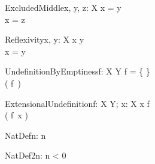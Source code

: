 
\begin{theorem}{ExcludedMiddle}{x, \const y, \const z: X}
x = y \\
x = z
\end{theorem}

\begin{theorem}{Reflexivity}{x, y: X}
x \neq y \\
x = y
\end{theorem}


\begin{theorem}{UndefinitionByEmptiness}{f: X \pfun Y}
f = \{ \} \\
\sw( f~\anything ) \\
\end{theorem}

\begin{theorem}{ExtensionalUndefinition}{f: X \pfun Y; x: X}
x \notin \dom f \\
\sw( f~x ) \\
\end{theorem}


\begin{theorem}{NatDef}{n: \nat}
 \leq n
\end{theorem}

\begin{theorem}{NatDef2}{n: \nat}
n < 0
\end{theorem}






